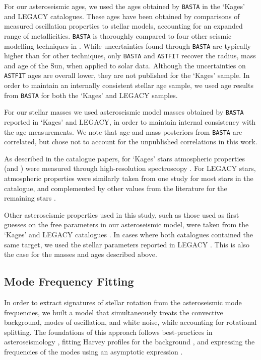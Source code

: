 For our asteroseismic ages, we used the ages obtained by \texttt{BASTA} \cite[BAyesian STellar Algorithm]{m_silvaaguirre+2015} in the `Kages' and LEGACY catalogues. These ages have been obtained by comparisons of measured oscillation properties to stellar models, accounting for an expanded range of metallicities. \texttt{BASTA} is thoroughly compared to four other seismic modelling techniques in \cite{m_silvaaguirre+2017}. While uncertainties found through \texttt{BASTA} are typically higher than for other techniques, only \texttt{BASTA} and \texttt{ASTFIT} \cite[Aarhus STellar Evolution Code]{m_christensen-dalsgaard2008} recover the radius, mass and age of the Sun, when applied to solar data. Although the uncertainties on \texttt{ASTFIT} ages are overall lower, they are not published for the `Kages' sample. In order to maintain an internally consistent stellar age sample, we used age results from \texttt{BASTA} for both the `Kages' and LEGACY samples.

For our stellar masses we used asteroseismic model masses obtained by \texttt{BASTA} reported in `Kages' and LEGACY, in order to maintain internal consistency with the age measurements. We note that age and mass posteriors from \texttt{BASTA} are correlated, but chose not to account for the unpublished correlations in this work.

As described in the catalogue papers, for `Kages' stars atmospheric properties (\teff and \feh) were measured through high-resolution spectroscopy \cite{m_huber+2013a}. For LEGACY stars, atmospheric properties were similarly taken from one study \cite{m_buchhave+latham2015} for most stars in the catalogue, and complemented by other values from the literature for the remaining stars \cite[see Table 3]{m_silvaaguirre+2017}.

Other asteroseismic properties used in this study, such as those used as first guesses on the free parameters in our asteroseismic model, were taken from the `Kages' and LEGACY catalogues \cite{m_astropycollaboration+2013, m_astropycollaboration+2018, m_ginsburg+2019}. In cases where both catalogues contained the same target, we used the stellar parameters reported in LEGACY \cite{m_mckinney2010}. This is also the case for the masses and ages described above.

\subsection{Mode Frequency Fitting}

In order to extract signatures of stellar rotation from the asteroseismic mode frequencies, we built a model that simultaneously treats the convective background, modes of oscillation, and white noise, while accounting for rotational splitting. The foundations of this approach follows best-practices in asteroseismology \cite{m_davies+2015}, fitting Harvey profiles for the background \cite{m_harvey1985}, and expressing the frequencies of the modes using an asymptotic expression \cite{m_tassoul1980, m_vrard+2016}.


